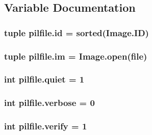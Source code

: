 \subsection{Variable Documentation}
\hypertarget{namespacepilfile_ac8e509b9ffc36e7e9aabdba7b9cd3bdb}{
\subsubsection[{id}]{\setlength{\rightskip}{0pt plus 5cm}tuple pilfile.\-id = sorted(Image.\-I\-D)}}\label{namespacepilfile_ac8e509b9ffc36e7e9aabdba7b9cd3bdb}
\hypertarget{namespacepilfile_a7fe12f1281925434a3ee6a17e796ccca}{
\subsubsection[{im}]{\setlength{\rightskip}{0pt plus 5cm}tuple pilfile.\-im = Image.\-open(file)}}\label{namespacepilfile_a7fe12f1281925434a3ee6a17e796ccca}
\hypertarget{namespacepilfile_a93ccc430396990132b94b395a0016c28}{
\subsubsection[{quiet}]{\setlength{\rightskip}{0pt plus 5cm}int pilfile.\-quiet = 1}}\label{namespacepilfile_a93ccc430396990132b94b395a0016c28}
\hypertarget{namespacepilfile_ac7af9a536a811856558caa209793888b}{
\subsubsection[{verbose}]{\setlength{\rightskip}{0pt plus 5cm}int pilfile.\-verbose = 0}}\label{namespacepilfile_ac7af9a536a811856558caa209793888b}
\hypertarget{namespacepilfile_a4ddd633e916dbdd7b9ebc5bcb826d1ea}{
\subsubsection[{verify}]{\setlength{\rightskip}{0pt plus 5cm}int pilfile.\-verify = 1}}\label{namespacepilfile_a4ddd633e916dbdd7b9ebc5bcb826d1ea}
